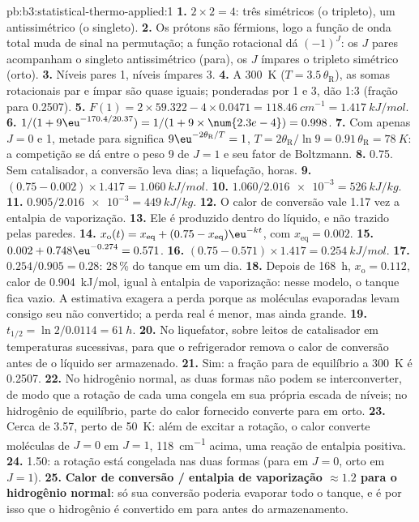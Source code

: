 \begin{solution}{pb:b3:statistical-thermo-applied:1}
\textbf{1.} $2 \times 2 = 4$: três simétricos (o tripleto), um antissimétrico (o singleto).
\textbf{2.} Os prótons são férmions, logo a função de onda total muda de sinal na
permutação; a função rotacional dá $(-1)^J$: os $J$ pares acompanham o singleto
antissimétrico (para), os $J$ ímpares o tripleto simétrico (orto).
\textbf{3.} Níveis pares 1, níveis ímpares 3.
\textbf{4.} A \qty{300}{K} ($T = 3.5\,\theta_{\mathrm R}$), as somas rotacionais par e ímpar são quase iguais;
ponderadas por 1 e 3, dão 1:3 (fração para 0.2507).
\textbf{5.} $F(1) = 2 \times 59.322 - 4 \times 0.0471 = \qty{118.46}{cm^{-1}} = \qty{1.417}{kJ/mol}$.
\textbf{6.} $1/(1 + 9\eu^{-170.4/20.37}) = 1/(1 + 9 \times \num{2.3e-4}) = 0.998$.
\textbf{7.} Com apenas $J = 0$ e 1, metade para significa $9\eu^{-2\theta_{\mathrm R}/T} = 1$, $T = 2\theta_{\mathrm R}/\ln9 =
0.91\,\theta_{\mathrm R} = \qty{78}{K}$: a competição se dá entre o peso 9 de $J = 1$ e seu
fator de Boltzmann.
\textbf{8.} 0.75. Sem catalisador, a conversão leva dias; a liquefação,
horas.
\textbf{9.} $(0.75 - 0.002) \times 1.417 = \qty{1.060}{kJ/mol}$.
\textbf{10.} $1.060/\num{2.016e-3} = \qty{526}{kJ/kg}$.
\textbf{11.} $0.905/\num{2.016e-3} = \qty{449}{kJ/kg}$.
\textbf{12.} O calor de conversão vale 1.17 vez a entalpia de vaporização.
\textbf{13.} Ele é produzido dentro do líquido, e não trazido pelas paredes.
\textbf{14.} $x_{\mathrm o}(t) = x_{\mathrm{eq}} + (0.75 - x_{\mathrm{eq}})\eu^{-kt}$, com $x_{\mathrm{eq}} = 0.002$.
\textbf{15.} $0.002 + 0.748\eu^{-0.274} = 0.571$.
\textbf{16.} $(0.75 - 0.571) \times 1.417 = \qty{0.254}{kJ/mol}$.
\textbf{17.} $0.254/0.905 = 0.28$: 28\,\% do tanque em um dia.
\textbf{18.} Depois de \qty{168}{h}, $x_{\mathrm o} = 0.112$, calor de \qty{0.904}{kJ/mol}, igual à entalpia de
vaporização: nesse modelo, o tanque fica vazio. A estimativa exagera a perda
porque as moléculas evaporadas levam consigo seu  não
convertido; a perda real é menor, mas ainda grande.
\textbf{19.} $t_{1/2} = \ln2/0.0114 = \qty{61}{h}$.
\textbf{20.} No liquefator, sobre leitos de catalisador em temperaturas sucessivas, para
que o refrigerador remova o calor de conversão antes de o líquido ser armazenado.
\textbf{21.} Sim: a fração para de equilíbrio a \qty{300}{K} é 0.2507.
\textbf{22.} No hidrogênio normal, as duas formas não podem se interconverter, de modo
que a rotação de cada uma congela em sua própria escada de níveis; no hidrogênio
de equilíbrio, parte do calor fornecido converte para em orto.
\textbf{23.} Cerca de 3.57, perto de \qty{50}{K}: além de excitar a rotação, o calor converte
moléculas de $J = 0$ em $J = 1$, \qty{118}{cm^{-1}} acima, uma reação de entalpia
positiva.
\textbf{24.} 1.50: a rotação está congelada nas duas formas (para em $J = 0$, orto em $J = 1$).
\textbf{25.} \textbf{Calor de conversão / entalpia de vaporização $\approx 1.2$ para o hidrogênio
normal}: só sua conversão poderia evaporar todo o tanque, e é por isso que o
hidrogênio é convertido em para antes do armazenamento.
\end{solution}
